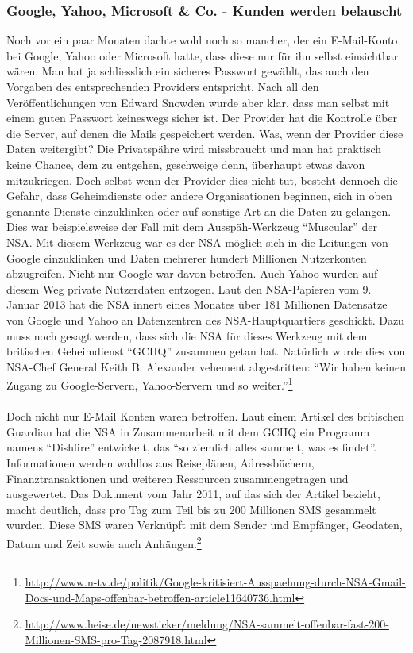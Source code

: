 \subsubsection{Google, Yahoo, Microsoft \& Co. - Kunden werden belauscht}
Noch vor ein paar Monaten dachte wohl noch so mancher, der ein E-Mail-Konto bei Google, Yahoo oder Microsoft hatte, dass diese nur für ihn selbst einsichtbar wären. Man hat ja schliesslich ein sicheres Passwort gewählt, das auch den Vorgaben des entsprechenden Providers entspricht. Nach all den Veröffentlichungen von Edward Snowden wurde aber klar, dass man selbst mit einem guten Passwort keineswegs sicher ist. Der Provider hat die Kontrolle über die Server, auf denen die Mails gespeichert werden. Was, wenn der Provider diese Daten weitergibt? Die Privatspähre wird missbraucht und man hat praktisch keine Chance, dem zu entgehen, geschweige denn, überhaupt etwas davon mitzukriegen.
Doch selbst wenn der Provider dies nicht tut, besteht dennoch die Gefahr, dass Geheimdienste oder andere Organisationen beginnen, sich in oben genannte Dienste einzuklinken oder auf sonstige Art an die Daten zu gelangen.
Dies war beispielsweise der Fall mit dem Ausspäh-Werkzeug ``Muscular'' der NSA. Mit diesem Werkzeug war es der NSA möglich sich in die Leitungen von Google einzuklinken und Daten mehrerer hundert Millionen Nutzerkonten abzugreifen. Nicht nur Google war davon betroffen. Auch Yahoo wurden auf diesem Weg private Nutzerdaten entzogen. Laut den NSA-Papieren vom 9. Januar 2013 hat die NSA innert eines Monates über 181 Millionen Datensätze von Google und Yahoo an Datenzentren des NSA-Hauptquartiers geschickt. Dazu muss noch gesagt werden, dass sich die NSA für dieses Werkzeug mit dem britischen Geheimdienst ``GCHQ'' zusammen getan hat.
Natürlich wurde dies von NSA-Chef General Keith B. Alexander vehement abgestritten: ``Wir haben keinen Zugang zu Google-Servern, Yahoo-Servern und so weiter.''\footnote{\url{http://www.n-tv.de/politik/Google-kritisiert-Ausspaehung-durch-NSA-Gmail-Docs-und-Maps-offenbar-betroffen-article11640736.html}} 
\\
\\
Doch nicht nur E-Mail Konten waren betroffen. Laut einem Artikel des britischen Guardian hat die NSA in Zusammenarbeit mit dem GCHQ ein Programm namens ``Dishfire'' entwickelt, das ``so ziemlich alles sammelt, was es findet''.
Informationen werden wahllos aus Reiseplänen, Adressbüchern, Finanztransaktionen und weiteren Ressourcen zusammengetragen und ausgewertet. Das Dokument vom Jahr 2011, auf das sich der Artikel bezieht, macht deutlich, dass pro Tag zum Teil bis zu 200 Millionen SMS gesammelt wurden. Diese SMS waren Verknüpft mit dem Sender und Empfänger, Geodaten, Datum und Zeit sowie auch Anhängen.\footnote{\url{http://www.heise.de/newsticker/meldung/NSA-sammelt-offenbar-fast-200-Millionen-SMS-pro-Tag-2087918.html}}

